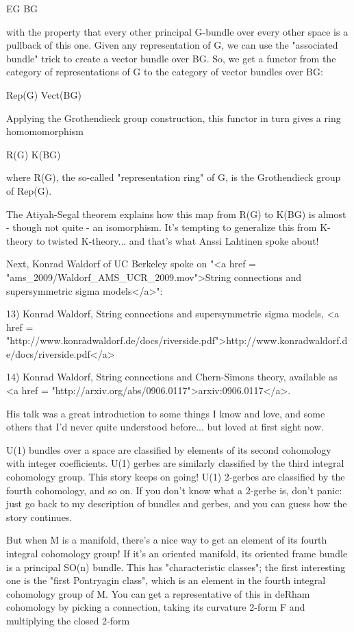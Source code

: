 EG \to  BG

with the property that every other principal G-bundle over every other
space is a pullback of this one.  Given any representation of G, we
can use the "associated bundle" trick to create a vector bundle over
BG.  So, we get a functor from the category of representations of G to
the category of vector bundles over BG:

Rep(G) \to  Vect(BG)

Applying the Grothendieck group construction, this functor in turn
gives a ring homomomorphism

R(G) \to  K(BG) 

where R(G), the so-called "representation ring" of G, is the
Grothendieck group of Rep(G).

The Atiyah-Segal theorem explains how this map from R(G) to K(BG) is
almost - though not quite - an isomorphism.  It's tempting to
generalize this from K-theory to twisted K-theory... and that's what
Anssi Lahtinen spoke about!

Next, Konrad Waldorf of UC Berkeley spoke on "<a href =
"ams_2009/Waldorf_AMS_UCR_2009.mov">String connections and
supersymmetric sigma models</a>":

13) Konrad Waldorf, String connections and supersymmetric sigma models,
<a href = "http://www.konradwaldorf.de/docs/riverside.pdf">http://www.konradwaldorf.de/docs/riverside.pdf</a>

14) Konrad Waldorf, String connections and Chern-Simons theory,
available as <a href =
"http://arxiv.org/abs/0906.0117">arxiv:0906.0117</a>.

His talk was a great introduction to some things I know and love, 
and some others that I'd never quite understood before... but loved at 
first sight now.

U(1) bundles over a space are classified by elements of its second 
cohomology with integer coefficients.  U(1) gerbes are similarly 
classified by the third integral cohomology group.  This story 
keeps on going!  U(1) 2-gerbes are classified by the fourth 
cohomology, and so on.  If you don't know what a 2-gerbe is, don't
panic: just go back to my description of bundles and gerbes, and you
can guess how the story continues.

But when M is a manifold, there's a nice way to get an element of its
fourth integral cohomology group!  If it's an oriented manifold, its
oriented frame bundle is a principal SO(n) bundle.  This has
"characteristic classes"; the first interesting one is the
"first Pontryagin class", which is an element in 
the fourth integral cohomology group of M.  You can get a
representative of this in deRham cohomology by picking a connection,
taking its curvature 2-form F and multiplying the closed 2-form

